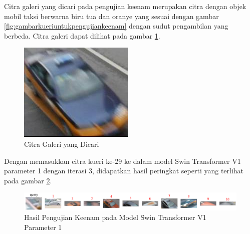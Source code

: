 Citra galeri yang dicari pada pengujian keenam merupakan citra dengan objek mobil taksi berwarna biru tua 
dan oranye yang sesuai dengan gambar \ref{fig:gambarkueriuntukpengujiankeenam} dengan sudut pengambilan yang berbeda. 
Citra galeri dapat dilihat pada gambar \ref{fig:gambargaleriuntukpengujiankeenam}.

\begin{figure}[h!]
  \centering
  \includegraphics[scale=0.3]{gambar/Gal29_1060.jpg}
  \caption{Citra Galeri yang Dicari}
  \label{fig:gambargaleriuntukpengujiankeenam}
\end{figure}

Dengan memasukkan citra kueri ke-29 ke dalam model Swin Transformer V1 parameter 1 dengan iterasi 3, didapatkan hasil 
peringkat seperti yang terlihat pada gambar \ref{fig:hasilpengujiankeenampadamodelswintransformerv1param1}.

\begin{figure}[h!]
  \centering
  \includegraphics[scale=0.6]{gambar/Que29V1P1IT3.png}
  \caption{Hasil Pengujian Keenam pada Model Swin Transformer V1 Parameter 1}
  \label{fig:hasilpengujiankeenampadamodelswintransformerv1param1}
\end{figure}


